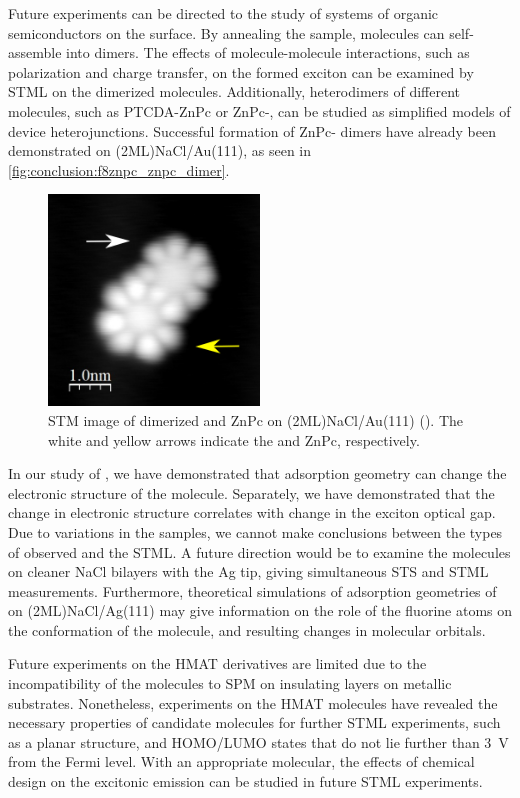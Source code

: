 Future experiments can be directed to the study of systems of organic semiconductors on the surface. By annealing the sample, molecules can self-assemble into dimers. The effects of molecule-molecule interactions, such as polarization and charge transfer, on the formed exciton can be examined by \ac{STML} on the dimerized molecules. Additionally, heterodimers of different molecules, such as PTCDA-ZnPc or ZnPc-, can be studied as simplified models of device heterojunctions. Successful formation of ZnPc- dimers have already been demonstrated on (2ML)NaCl/Au(111), as seen in \autoref{fig:conclusion:f8znpc_znpc_dimer}. 

\begin{figure}[H]
    \centering
    \includegraphics[width=0.5\textwidth]{pictures/f8znpc_znpc_dimer_arrows.png}
    \caption{\sloppy STM image of dimerized  and ZnPc on (2ML)NaCl/\-Au(111) (). The white and yellow arrows indicate the  and ZnPc, respectively.}
    \label{fig:conclusion:f8znpc_znpc_dimer}
\end{figure}

In our study of , we have demonstrated that adsorption geometry can change the electronic structure of the molecule. Separately, we have demonstrated that the change in electronic structure correlates with change in the exciton optical gap. Due to variations in the samples, we cannot make conclusions between the types of  observed and the \ac{STML}. A future direction would be to examine the molecules on cleaner NaCl bilayers with the Ag tip, giving simultaneous \ac{STS} and \ac{STML} measurements. Furthermore, theoretical simulations of adsorption geometries of  on (2ML)NaCl/Ag(111) may give information on the role of the fluorine atoms on the conformation of the molecule, and resulting changes in molecular orbitals.

Future experiments on the HMAT derivatives are limited due to the incompatibility of the molecules to \ac{SPM} on insulating layers on metallic substrates. Nonetheless, experiments on the HMAT molecules have revealed the necessary properties of candidate molecules for further \ac{STML} experiments, such as a planar structure, and HOMO/LUMO states that do not lie further than \SI{3}{V} from the Fermi level. With an appropriate molecular, the effects of chemical design on the excitonic emission can be studied in future \ac{STML} experiments.





                                    